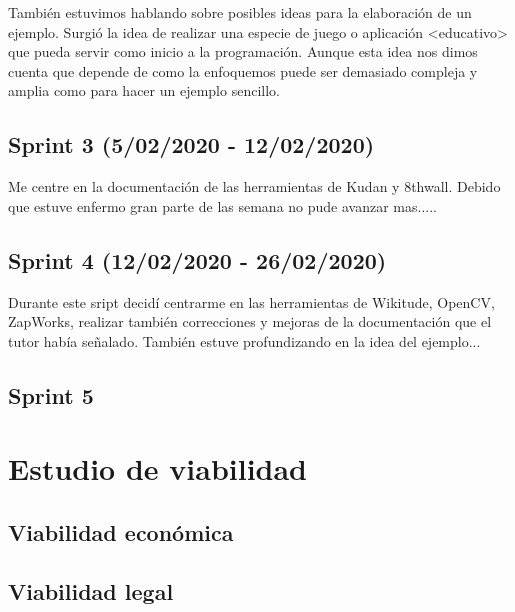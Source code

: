 También estuvimos hablando sobre posibles ideas para la elaboración de un ejemplo. Surgió la idea de realizar una especie de juego o aplicación <educativo> que pueda servir como inicio a la programación. Aunque esta idea nos dimos cuenta que depende de como la enfoquemos puede ser demasiado compleja y amplia como para hacer un ejemplo sencillo.
\subsection{Sprint 3 (5/02/2020 - 12/02/2020)}

Me centre en la documentación de las herramientas de Kudan y 8thwall.
Debido que estuve enfermo gran parte de las semana no pude avanzar mas.....
\subsection{Sprint 4 (12/02/2020 - 26/02/2020)}
Durante este sript decidí centrarme en las herramientas de Wikitude, OpenCV, ZapWorks, realizar también correcciones y mejoras de la documentación que el tutor había señalado.
También estuve profundizando en la idea del ejemplo... 
\subsection{Sprint 5}

\section{Estudio de viabilidad}

\subsection{Viabilidad económica}

\subsection{Viabilidad legal}


